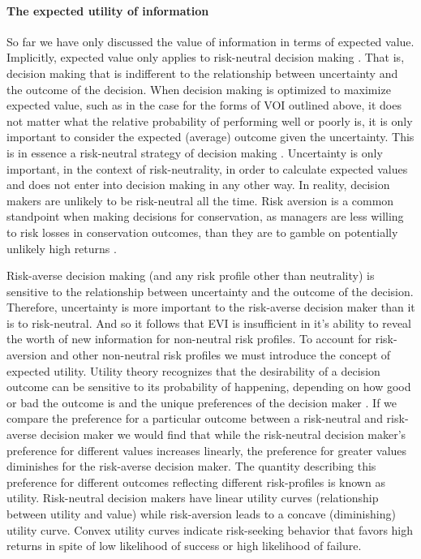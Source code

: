 \documentclass[]{article}
\theoremstyle{definition}
\theoremstyle{definition}
\theoremstyle{definition}
\theoremstyle{remark}
\begin{document}
\paragraph*{The expected utility of
information}\label{the-expected-utility-of-information}

So far we have only discussed the value of information in terms of
expected value. Implicitly, expected value only applies to risk-neutral
decision making \citep{Hazen1999}. That is, decision making that is
indifferent to the relationship between uncertainty and the outcome of
the decision. When decision making is optimized to maximize expected
value, such as in the case for the forms of VOI outlined above, it does
not matter what the relative probability of performing well or poorly
is, it is only important to consider the expected (average) outcome
given the uncertainty. This is in essence a risk-neutral strategy of
decision making \citep{VonNeumann1944}. Uncertainty is only important,
in the context of risk-neutrality, in order to calculate expected values
and does not enter into decision making in any other way. In reality,
decision makers are unlikely to be risk-neutral all the time. Risk
aversion is a common standpoint when making decisions for conservation,
as managers are less willing to risk losses in conservation outcomes,
than they are to gamble on potentially unlikely high returns
\citep{Tulloch2015}.

Risk-averse decision making (and any risk profile other than neutrality)
is sensitive to the relationship between uncertainty and the outcome of
the decision. Therefore, uncertainty is more important to the
risk-averse decision maker than it is to risk-neutral. And so it follows
that EVI is insufficient in it's ability to reveal the worth of new
information for non-neutral risk profiles. To account for risk-aversion
and other non-neutral risk profiles we must introduce the concept of
expected utility. Utility theory recognizes that the desirability of a
decision outcome can be sensitive to its probability of happening,
depending on how good or bad the outcome is and the unique preferences
of the decision maker \citep{VonNeumann1944}. If we compare the
preference for a particular outcome between a risk-neutral and
risk-averse decision maker we would find that while the risk-neutral
decision maker's preference for different values increases linearly, the
preference for greater values diminishes for the risk-averse decision
maker. The quantity describing this preference for different outcomes
reflecting different risk-profiles is known as utility. Risk-neutral
decision makers have linear utility curves (relationship between utility
and value) while risk-aversion leads to a concave (diminishing) utility
curve. Convex utility curves indicate risk-seeking behavior that favors
high returns in spite of low likelihood of success or high likelihood of
failure.
\end{document}
